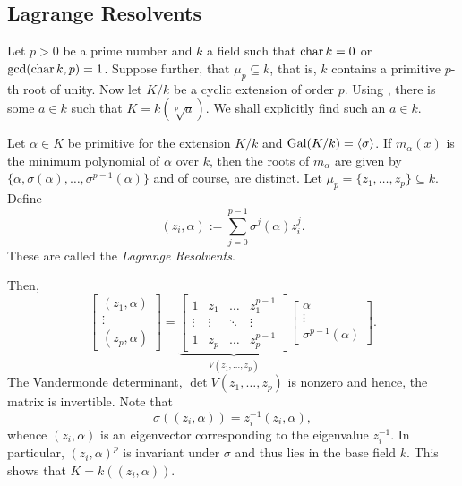 \subsection{Lagrange Resolvents}

Let $p > 0$ be a prime number and $k$ a field such that $\operatorname{char} k = 0$ or $\gcd(\operatorname{char} k, p) = 1$. Suppose further, that $\mu_p\subseteq k$, that is, $k$ contains a primitive $p$-th root of unity. Now let $K/k$ be a cyclic extension of order $p$. Using , there is some $a\in k$ such that $K = k(\sqrt[p]{a})$. We shall explicitly find such an $a\in k$.

Let $\alpha\in K$ be primitive for the extension $K/k$ and $\operatorname{Gal}(K/k) = \langle\sigma\rangle$. If $m_\alpha(x)$ is the minimum polynomial of $\alpha$ over $k$, then the roots of $m_\alpha$ are given by $\{\alpha,\sigma(\alpha),\dots,\sigma^{p - 1}(\alpha)\}$ and of course, are distinct. Let $\mu_p = \{z_1,\dots,z_p\}\subseteq k$. Define 
\begin{equation*}
    (z_i, \alpha) := \sum_{j = 0}^{p - 1}\sigma^j(\alpha)z_i^{j}.
\end{equation*}
These are called the \emph{Lagrange Resolvents}.

Then, 
\begin{equation*}
    \begin{bmatrix}
        (z_1,\alpha)\\\vdots\\(z_p,\alpha)
    \end{bmatrix}
    = 
    \underbrace{
    \begin{bmatrix}
        1 & z_1 & \dots & z_1^{p - 1}\\
        \vdots & \vdots & \ddots & \vdots \\
        1 & z_p & \dots & z_p^{p - 1}
    \end{bmatrix}
    }_{V(z_1,\dots,z_p)}
    \begin{bmatrix}
        \alpha\\\vdots\\\sigma^{p - 1}(\alpha)
    \end{bmatrix}.
\end{equation*}
The Vandermonde determinant, $\det V(z_1,\dots,z_p)$ is nonzero and hence, the matrix is invertible. Note that 
\begin{equation*}
    \sigma((z_i,\alpha)) = z_i^{-1} (z_i,\alpha),
\end{equation*}
whence $(z_i,\alpha)$ is an eigenvector corresponding to the eigenvalue $z_i^{-1}$. In particular, $(z_i,\alpha)^p$ is invariant under $\sigma$ and thus lies in the base field $k$. This shows that $K = k((z_i,\alpha))$.

